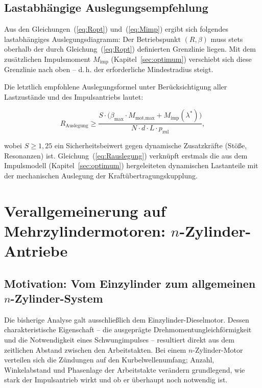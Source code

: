 ﻿\documentclass[a4paper,12pt]{article}
\begin{document}
\subsection{Lastabhängige Auslegungsempfehlung}

Aus den Gleichungen~(\ref{eq:Ropt}) und~(\ref{eq:Mimp}) ergibt sich folgendes
lastabhängiges Auslegungsdiagramm: Der Betriebspunkt $(R, \beta)$ muss stets
oberhalb der durch Gleichung~(\ref{eq:Ropt}) definierten Grenzlinie liegen.
Mit dem zusätzlichen Impulsmoment $M_\text{imp}$ (Kapitel~\ref{sec:optimum})
verschiebt sich diese Grenzlinie nach oben -- d.\,h. der erforderliche
Mindestradius steigt.

Die letztlich empfohlene Auslegungsformel unter Berücksichtigung aller
Lastzustände und des Impulsantriebs lautet:

\begin{equation}
  \boxed{
  R_\text{Auslegung} \geq \frac{S \cdot \bigl(\beta_\text{max} \cdot M_\text{mot,max}
    + M_\text{imp}(\lambda^*)\bigr)}{N \cdot d \cdot L \cdot p_\text{zul}},
  }
  \label{eq:Rauslegung}
\end{equation}

\noindent
wobei $S \geq 1{,}25$ ein Sicherheitsbeiwert gegen dynamische Zusatzkräfte
(Stöße, Resonanzen) ist. Gleichung~(\ref{eq:Rauslegung}) verknüpft erstmals
die aus dem Impulsmodell (Kapitel~\ref{sec:optimum}) hergeleiteten dynamischen
Lastanteile mit der mechanischen Auslegung der Kraftübertragungskupplung.

\section{Verallgemeinerung auf Mehrzylindermotoren: $n$-Zylinder-Antriebe}
\label{sec:nzylinder}

\subsection{Motivation: Vom Einzylinder zum allgemeinen $n$-Zylinder-System}

Die bisherige Analyse galt ausschließlich dem Einzylinder-Dieselmotor.
Dessen charakteristische Eigenschaft -- die ausgeprägte Drehmomentungleichförmigkeit
und die Notwendigkeit eines Schwungimpulses -- resultiert direkt aus dem
zeitlichen Abstand zwischen den Arbeitstakten. Bei einem $n$-Zylinder-Motor
verteilen sich die Zündungen auf den Kurbelwellenumfang; Anzahl, Winkelabstand
und Phasenlage der Arbeitstakte verändern grundlegend, wie stark der Impulsantrieb
wirkt und ob er überhaupt noch notwendig ist.
\end{document}

